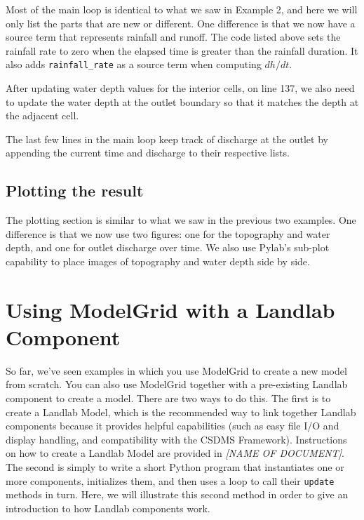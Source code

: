 \documentclass[12pt]{article}
\newcommand{\code}[1]{{\tt #1}}
\begin{document}


Most of the main loop is identical to what we saw in Example 2, and here we will only list the parts that are new or different. One difference is that we now have a source term that represents rainfall and runoff. The code listed above sets the rainfall rate to zero when the elapsed time is greater than the rainfall duration. It also adds \code{rainfall\_rate} as a source term when computing $dh/dt$.



After updating water depth values for the interior cells, on line 137, we also need to update the water depth at the outlet boundary so that it matches the depth at the adjacent cell.



The last few lines in the main loop keep track of discharge at the outlet by appending the current time and discharge to their respective lists.

\subsection{Plotting the result}

The plotting section is similar to what we saw in the previous two examples. One difference is that we now use two figures: one for the topography and water depth, and one for outlet discharge over time. We also use Pylab's sub-plot capability to place images of topography and water depth side by side.



\section{Using ModelGrid with a Landlab Component}

So far, we've seen examples in which you use ModelGrid to create a new model from scratch. You can also use ModelGrid together with a pre-existing Landlab component to create a model. There are two ways to do this. The first is to create a Landlab Model, which is the recommended way to link together Landlab components because it provides helpful capabilities (such as easy file I/O and display handling, and compatibility with the CSDMS Framework). Instructions on how to create a Landlab Model are provided in {\em [NAME OF DOCUMENT]}. The second is simply to write a short Python program that instantiates one or more components, initializes them, and then uses a loop to call their \code{update} methods in turn. Here, we will illustrate this second method in order to give an introduction to how Landlab components work.
\end{document}
